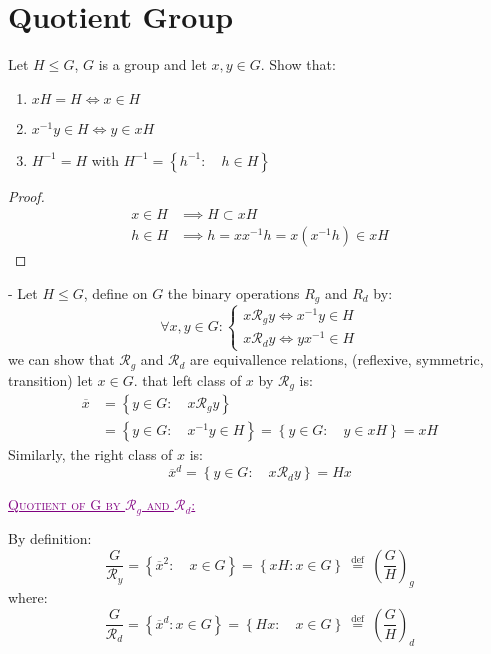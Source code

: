 \section{Quotient Group}
\exercise 
Let $H \leq G $, $G $ is a group and let $x,y \in  G $. Show that:
\begin{enumerate}
\item $xH = H  \iff x \in H$ 
  \item $x^{-1} y \in H \iff y \in xH $  
    \item $H^{-1} = H  $ with $H^{-1} = \left\{ h^{-1}: \quad h \in  H \right\} $  
\end{enumerate}
\begin{proof}
  \begin{align*}
    x \in  H & \implies 
    H \subset x H \\
    h \in  H & \implies h 
    = x x^{-1} h = x (x^{-1} h)  \in  x H
  \end{align*}
\end{proof}
- Let $H \leq G $, define on $G $ the binary operations $R_{g} $ and $R_{d} $ by: 
\[
\forall x,y \in G: 
\begin{cases}
x \mathcal{R} _{g} y \iff x^{-1} y \in H \\
x \mathcal{R} _{d} y \iff y x^{-1} \in H
\end{cases}
\]
we can show that $\mathcal{R}_{g}  $ and $\mathcal{R} _{d} $  are 
equivallence relations, (reflexive, symmetric, transition) let $x \in  G $. 
that left class of $x $ by $\mathcal{R} _{g} $ is:
\begin{align*}
  \overline{x} &= 
  \left\{ y \in G: \quad x \mathcal{R} _{g} y \right\} \\
               &= 
               \left\{ y \in  G: \quad x^{-1}y \in  H \right\} = 
               \left\{ y \in  G: \quad y \in xH \right\} = xH
\end{align*}
Similarly, the right class of $x $ is: 
\[
\overline{x}^{d} = 
\left\{ y \in  G: \quad x \mathcal{R} _{d} y \right\} = Hx
\]
\begin{center}
  \textcolor{purple}{\underline{\textsc{Quotient of G by $\mathcal{R} _{g} $ and $\mathcal{R} _{d} $: }}}
\end{center}
By definition: 
\[
  \frac{G}{\mathcal{R} _{y}} = 
  \left\{ 
    \overline{x}^2 : \quad x \in G
  \right\} = 
  \left\{ 
    x H: x \in G
  \right\}
    \overset{\text{ def } }{=}  
    \left( 
      \frac{G}{H}
    \right)_{g}
\]
where: 
\[
  \frac{G}{\mathcal{R} _{d}} = 
  \left\{ 
    \overline{x}^{d}: x \in  G
  \right\} = 
  \left\{ Hx: \quad  x \in  G \right\} 
  \overset{ \text{ def } }{ = }  
  \left( 
    \frac{G}{H}
  \right)_{d}
\]

